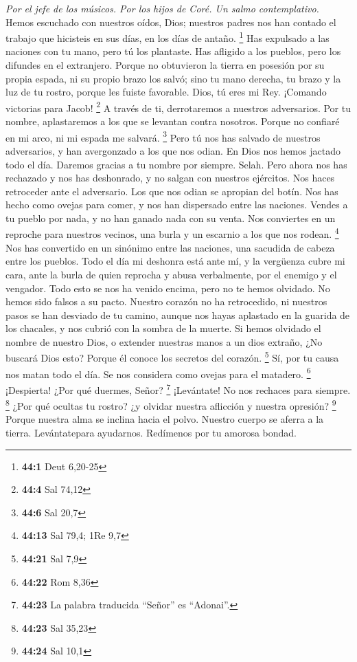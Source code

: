\begin{paracol}{2}
\emph{Por el jefe de los músicos. Por los hijos de Coré. Un salmo
contemplativo.}\\
 Hemos escuchado con nuestros oídos, Dios; nuestros padres
nos han contado el trabajo que hicisteis en sus días, en los días de
antaño. \footnote{\textbf{44:1} Deut 6,20-25}  Has
expulsado a las naciones con tu mano, pero tú los plantaste. Has
afligido a los pueblos, pero los difundes en el extranjero.
 Porque no obtuvieron la tierra en posesión por su propia
espada, ni su propio brazo los salvó; sino tu mano derecha, tu brazo y
la luz de tu rostro, porque les fuiste favorable.  Dios,
tú eres mi Rey. ¡Comando victorias para Jacob! \footnote{\textbf{44:4}
  Sal 74,12}  A través de ti, derrotaremos a nuestros
adversarios. Por tu nombre, aplastaremos a los que se levantan contra
nosotros.  Porque no confiaré en mi arco, ni mi espada me
salvará. \footnote{\textbf{44:6} Sal 20,7}  Pero tú nos
has salvado de nuestros adversarios, y han avergonzado a los que nos
odian.  En Dios nos hemos jactado todo el día. Daremos
gracias a tu nombre por siempre. Selah.  Pero ahora nos
has rechazado y nos has deshonrado, y no salgan con nuestros ejércitos.
 Nos haces retroceder ante el adversario. Los que nos
odian se apropian del botín.  Nos has hecho como ovejas
para comer, y nos han dispersado entre las naciones. 
Vendes a tu pueblo por nada, y no han ganado nada con su venta.
 Nos conviertes en un reproche para nuestros vecinos, una
burla y un escarnio a los que nos rodean. \footnote{\textbf{44:13} Sal
  79,4; 1Re 9,7}  Nos has convertido en un sinónimo entre
las naciones, una sacudida de cabeza entre los pueblos. 
Todo el día mi deshonra está ante mí, y la vergüenza cubre mi cara,
 ante la burla de quien reprocha y abusa verbalmente, por
el enemigo y el vengador.  Todo esto se nos ha venido
encima, pero no te hemos olvidado. No hemos sido falsos a su pacto.
 Nuestro corazón no ha retrocedido, ni nuestros pasos se
han desviado de tu camino,  aunque nos hayas aplastado en
la guarida de los chacales, y nos cubrió con la sombra de la muerte.
 Si hemos olvidado el nombre de nuestro Dios, o extender
nuestras manos a un dios extraño,  ¿No buscará Dios esto?
Porque él conoce los secretos del corazón. \footnote{\textbf{44:21} Sal
  7,9}  Sí, por tu causa nos matan todo el día. Se nos
considera como ovejas para el matadero. \footnote{\textbf{44:22} Rom
  8,36}  ¡Despierta! ¿Por qué duermes, Señor? \footnote{\textbf{44:23}
  La palabra traducida ``Señor'' es ``Adonai''.} ¡Levántate! No nos
rechaces para siempre. \footnote{\textbf{44:23} Sal 35,23}
 ¿Por qué ocultas tu rostro? ¿y olvidar nuestra aflicción
y nuestra opresión? \footnote{\textbf{44:24} Sal 10,1} 
Porque nuestra alma se inclina hacia el polvo. Nuestro cuerpo se aferra
a la tierra.  Levántatepara ayudarnos. Redímenos por tu
amorosa bondad.


\end{paracol}
